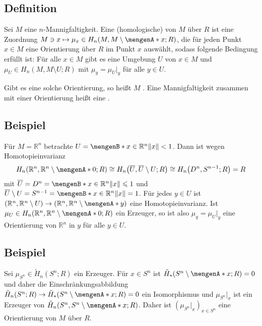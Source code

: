 \subsection[Definition: Homologische Orientierung auf der gesamten Mannigfaltigkeit]{Definition} %
\label{sub:165}
Sei $M$ eine $n$-Mannigfaltigkeit. Eine (homologische)  von $M$ über $R$ ist eine Zuordnung 
$M \ni x \mapsto \mu_x \in H_n(M,M \setminus\set{x};R)$, die für jeden Punkt $x\in M$ eine Orientierung über $R$ im Punkt $x$ auswählt, sodass folgende Bedingung erfüllt ist:
Für alle $x \in M$ gibt es eine Umgebung $U$ von $x \in M$ und $\mu_U \in H_n(M,M \setminus U;R)$ mit $\mu_y =\mu_U|_y$ für alle $y \in U$.

Gibt es eine solche Orientierung, so heißt $M$ . Eine Mannigfaltigkeit zusammen mit einer Orientierung heißt eine .  

\subsection{Beispiel} %
\label{sub:166}
Für $M=\mathds{R}^n$ betrachte $U= \set[x \in \mathds{R}^n]{\norm{x}<1}$. Dann ist wegen Homotopieinvarianz
\[
	H_n \enbrace*{\mathds{R}^n,\mathds{R}^n \setminus \set{0};R} \cong H_n \enbrace*{\overline{U},\overline{U} \setminus U;R} \cong H_n \enbrace*{D^n,S^{n-1};R}=R 
\]
mit $\overline{U} = D^n  = \set[x \in \mathds{R}^n]{\norm{x}\le 1}$ und $\overline{U}\setminus U = S^{n-1} =\set[x \in \mathds{R}^n]{\norm{x}=1} $. Für jedes $y \in U$
ist $\enbrace*{\mathds{R}^n,\mathds{R}^n \setminus U} \to \enbrace*{\mathds{R}^n, \mathds{R}^n\setminus \set{y}}$ eine Homotopieinvarianz. Ist $\mu_U \in H_n(\mathds{R}^n,\mathds{R}^n \setminus \set{0};R)$ ein Erzeuger, so ist also $\mu_y = \mu_U|_y$ eine Orientierung von $\mathds{R}^n$ in $y$ für alle $y \in U$.

\subsection[Beispiel: Orientierung von $S^n$]{Beispiel} %
\label{sub:167}
Sei $\mu_{S^n} \in \tilde{H}_n(S^n;R)$ ein Erzeuger. Für $x \in S^n$ ist $\tilde{H}_*(S^n \setminus \set{x};R)= 0$ und daher die Einschränkungsabbildung 
$\tilde{H}_n(S^n;R) \to \tilde{H}_*(S^n \setminus \set{x};R)= 0$ ein Isomorphismus und $\mu_{S^n}|_x$ ist ein Erzeuger von $\tilde{H}_n(S^n, S^n\setminus \set{x};R)$. Daher 
ist $(\mu_{S^n}|_x)_{x \in S^n}$ eine Orientierung von $M$ über $R$.

